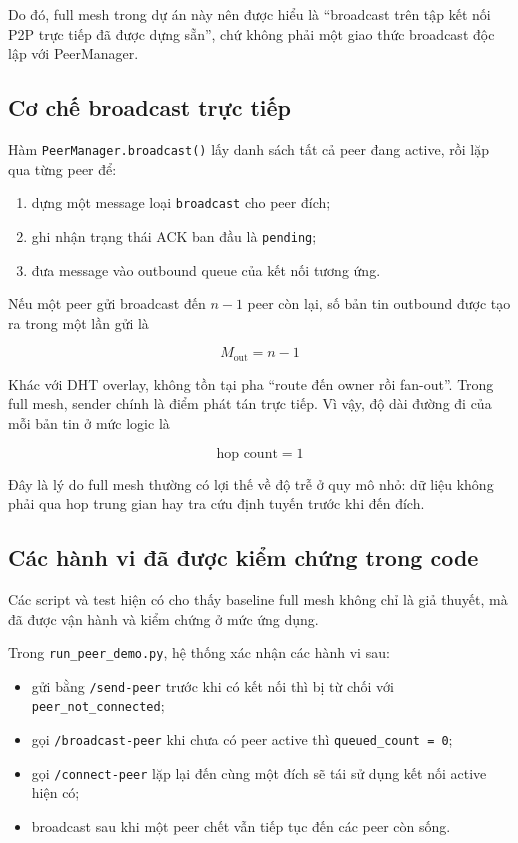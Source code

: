 Do đó, full mesh trong dự án này nên được hiểu là ``broadcast trên tập kết nối P2P trực tiếp đã được dựng sẵn'', chứ không phải một giao thức broadcast độc lập với PeerManager.

\subsection{Cơ chế broadcast trực tiếp}
Hàm \texttt{PeerManager.broadcast()} lấy danh sách tất cả peer đang active, rồi lặp qua từng peer để:
\begin{enumerate}[leftmargin=2em]
    \item dựng một message loại \texttt{broadcast} cho peer đích;
    \item ghi nhận trạng thái ACK ban đầu là \texttt{pending};
    \item đưa message vào outbound queue của kết nối tương ứng.
\end{enumerate}

Nếu một peer gửi broadcast đến \(n-1\) peer còn lại, số bản tin outbound được tạo ra trong một lần gửi là
\begin{center}
\[
M_{\text{out}} = n - 1
\]
\end{center}

Khác với DHT overlay, không tồn tại pha ``route đến owner rồi fan-out''. Trong full mesh, sender chính là điểm phát tán trực tiếp. Vì vậy, độ dài đường đi của mỗi bản tin ở mức logic là
\begin{center}
\[
\text{hop count} = 1
\]
\end{center}

Đây là lý do full mesh thường có lợi thế về độ trễ ở quy mô nhỏ: dữ liệu không phải qua hop trung gian hay tra cứu định tuyến trước khi đến đích.

\subsection{Các hành vi đã được kiểm chứng trong code}
Các script và test hiện có cho thấy baseline full mesh không chỉ là giả thuyết, mà đã được vận hành và kiểm chứng ở mức ứng dụng.

Trong \texttt{run\_peer\_demo.py}, hệ thống xác nhận các hành vi sau:
\begin{itemize}[leftmargin=2em]
    \item gửi bằng \texttt{/send-peer} trước khi có kết nối thì bị từ chối với \texttt{peer\_not\_connected};
    \item gọi \texttt{/broadcast-peer} khi chưa có peer active thì \texttt{queued\_count = 0};
    \item gọi \texttt{/connect-peer} lặp lại đến cùng một đích sẽ tái sử dụng kết nối active hiện có;
    \item broadcast sau khi một peer chết vẫn tiếp tục đến các peer còn sống.
\end{itemize}

